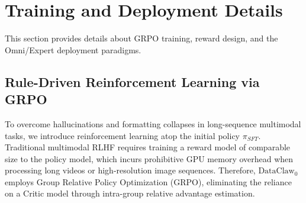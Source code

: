 \documentclass{llmxive}
\begin{document}








\section{Training and Deployment Details}
\label{app:training_details}

This section provides details about GRPO training, reward design, and the Omni/Expert deployment paradigms.


\subsection{Rule-Driven Reinforcement Learning via GRPO}
\label{app:grpo}
To overcome hallucinations and formatting collapses in long-sequence multimodal tasks, we introduce reinforcement learning atop the initial policy \(\pi_{SFT}\). Traditional multimodal RLHF requires training a reward model of comparable size to the policy model, which incurs prohibitive GPU memory overhead when processing long videos or high-resolution image sequences. Therefore, $\text{DataClaw}_0$ employs Group Relative Policy Optimization (GRPO), eliminating the reliance on a Critic model through intra-group relative advantage estimation.
\end{document}
